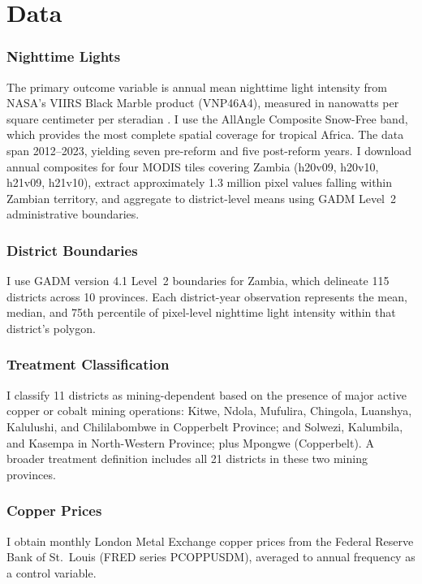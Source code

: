 \documentclass[12pt]{article}
\begin{document}
\section{Data}
\label{sec:data}

\subsubsection*{Nighttime Lights} The primary outcome variable is annual mean nighttime light intensity from NASA's VIIRS Black Marble product (VNP46A4), measured in nanowatts per square centimeter per steradian \citep{roman2018nasa}. I use the AllAngle Composite Snow-Free band, which provides the most complete spatial coverage for tropical Africa. The data span 2012--2023, yielding seven pre-reform and five post-reform years. I download annual composites for four MODIS tiles covering Zambia (h20v09, h20v10, h21v09, h21v10), extract approximately 1.3 million pixel values falling within Zambian territory, and aggregate to district-level means using GADM Level~2 administrative boundaries.

\subsubsection*{District Boundaries} I use GADM version 4.1 Level~2 boundaries for Zambia, which delineate 115 districts across 10 provinces. Each district-year observation represents the mean, median, and 75th percentile of pixel-level nighttime light intensity within that district's polygon.

\subsubsection*{Treatment Classification} I classify 11 districts as mining-dependent based on the presence of major active copper or cobalt mining operations: Kitwe, Ndola, Mufulira, Chingola, Luanshya, Kalulushi, and Chililabombwe in Copperbelt Province; and Solwezi, Kalumbila, and Kasempa in North-Western Province; plus Mpongwe (Copperbelt). A broader treatment definition includes all 21 districts in these two mining provinces.

\subsubsection*{Copper Prices} I obtain monthly London Metal Exchange copper prices from the Federal Reserve Bank of St.\ Louis (FRED series PCOPPUSDM), averaged to annual frequency as a control variable.
\end{document}
